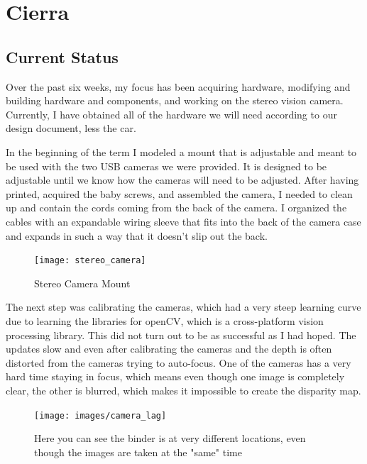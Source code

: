 \documentclass[compsoc,draftclsnofoot,onecolumn,10pt]{IEEEtran}
\begin{document}
\section{Cierra}
	\subsection{Current Status}
		Over the past six weeks, my focus has been acquiring hardware, modifying and building hardware and components, and working on the stereo vision camera. 
		Currently, I have obtained all of the hardware we will need according to our design document, less the car. 
		
		In the beginning of the term I modeled a mount that is adjustable and meant to be used with the two USB cameras we were provided. 
		It is designed to be adjustable until we know how the cameras will need to be adjusted. 
		After having printed, acquired the baby screws, and assembled the camera, I needed to clean up and contain the cords coming from the back of the camera. 
		I organized the cables with an expandable wiring sleeve that fits into the back of the camera case and expands in such a way that it doesn't slip out the back. 
		\begin{figure}[H]
 		\centering
		\texttt{[image: stereo\_camera]}
		\caption{Stereo Camera Mount}
		\end{figure}
		
		The next step was calibrating the cameras, which had a very steep learning curve due to learning the libraries for openCV, which is a cross-platform vision processing library. 
		This did not turn out to be as successful as I had hoped.
		The updates slow and even after calibrating the cameras and the depth is often distorted from the cameras trying to auto-focus. 
		One of the cameras has a very hard time staying in focus, which means even though one image is completely clear, the other is blurred, which makes it impossible to create the disparity map.
		
		\begin{figure}[H]
 		\centering
		\texttt{[image: images/camera\_lag]}
		\caption{Here you can see the binder is at very different locations, even though the images are taken at the "same" time}
		\end{figure}
		
\end{document}

